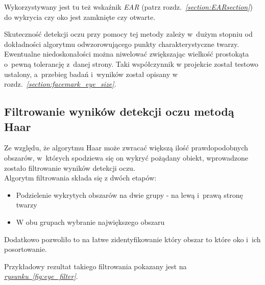 Wykorzystywany jest tu też wskaźnik \textit{EAR} (patrz rozdz.~\hyperref[{section:EARsection}]{\textit{\ref{section:EARsection}}}) do wykrycia czy oko jest zamknięte czy otwarte.

\par

Skuteczność detekcji oczu przy pomocy tej metody zależy w~dużym stopniu od dokładności algorytmu odwzorowującego punkty charakterystyczne twarzy. Ewentualne niedoskonałości można niwelować zwiększając wielkość prostokąta o~pewną tolerancję z~danej strony. Taki współczynnik w projekcie został testowo ustalony, a~przebieg badań i~wyników został opisany w rozdz.~\hyperref[{section:facemark_eye_size}]{\textit{\ref{section:facemark_eye_size}}}.



\subsection{Filtrowanie wyników detekcji oczu metodą Haar}

Ze względu, że algorytmu Haar może zwracać większą ilość prawdopodobnych obszarów, w~których spodziewa się on wykryć pożądany obiekt, wprowadzone zostało filtrowanie wyników detekcji oczu. \\
Algorytm filtrowania składa się z dwóch etapów:

\begin{itemize}
    \item Podzielenie wykrytych obszarów na dwie grupy - na lewą i~prawą stronę twarzy
    \item W obu grupach wybranie największego obszaru
\end{itemize}


Dodatkowo pozwoliło to na łatwe zidentyfikowanie który obszar to które oko i~ich posortowanie.

\par

Przykładowy rezultat takiego filtrowania pokazany jest na \hyperref[{fig:eye_filter}]{\textit{rysunku~\ref{fig:eye_filter}}}. 


